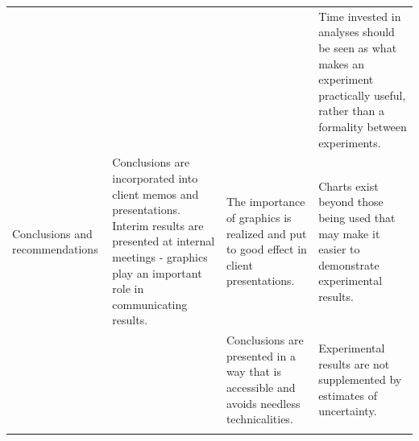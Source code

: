 \documentclass[11pt,a4paper,article]{memoir} %
\begin{document}
\begin{landscape}
{\begin{longtable}{p{4cm} p{7cm} p{6cm} p{6cm}}
 &  &  & Time invested in analyses should be seen as what makes an experiment practically useful, rather than a formality between experiments. \\ 
\cmidrule{1-4}
Conclusions and recommendations & Conclusions are incorporated into client memos and presentations. Interim results are presented at internal meetings - graphics play an important role in communicating results. & The importance of graphics is realized and put to good effect in client presentations. & Charts exist beyond those being used that may make it easier to demonstrate experimental results. \\ 
 &  & Conclusions are presented in a way that is accessible and avoids needless technicalities. & Experimental results are not supplemented by estimates of uncertainty. \\ 
\bottomrule
\label{tab:exp_procedure}
\end{longtable}
}
\end{landscape}
\end{document}
